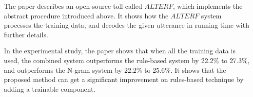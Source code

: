 The paper describes an open-source toll called $ALTERF$, which implements the abstract procedure introduced above. It shows how the $ALTERF$ system processes the training data, and decodes the given utterance in running time with further details.

In the experimental study, the paper shows that when all the training data is used, the combined system outperforms the rule-based system by 22.2\% to 27.3\%, and outperforms the N-gram system by 22.2\% to 25.6\%. It shows that the proposed method can get a significant improvement on rules-based technique by adding a trainable component. 